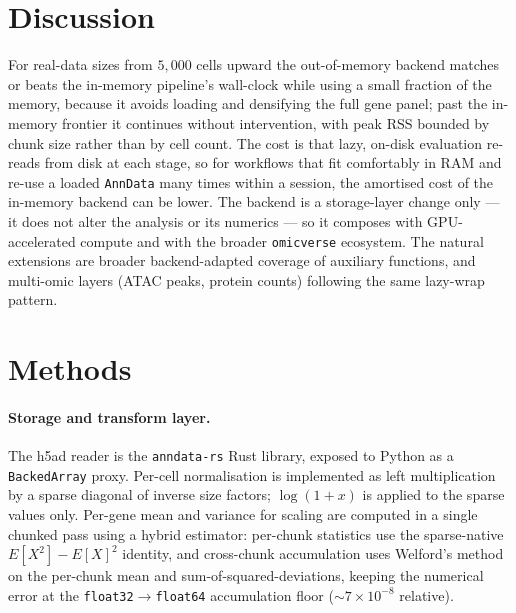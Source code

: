 \documentclass[11pt]{article}
\newcommand{\cmark}{\textcolor{green!55!black}{\checkmark}}
\newcommand{\xmark}{\textcolor{red!70!black}{\ensuremath{\times}}}
\begin{document}
\begin{table}[t]
  \centering\footnotesize
  \caption{\textbf{\texttt{omicverse.pp} compatibility} on the out-of-memory
    backend. \cmark\ = runs to completion; \xmark\ = raises (not yet
    backend-adapted); superscript \textsuperscript{G} marks a call that
    offloads to the GPU under \texttt{cpu-gpu-mixed}.}
  \label{tab:compat}
  
\end{table}

\section{Discussion}

For real-data sizes from $5{,}000$ cells upward the out-of-memory backend
matches or beats the in-memory pipeline's wall-clock while using a small
fraction of the memory, because it avoids loading and densifying the full
gene panel; past the in-memory frontier it continues without intervention,
with peak RSS bounded by chunk size rather than by cell count. The cost is
that lazy, on-disk evaluation re-reads from disk at each stage, so for
workflows that fit comfortably in RAM and re-use a loaded \texttt{AnnData}
many times within a session, the amortised cost of the in-memory backend can
be lower. The backend is a storage-layer change only --- it does not alter
the analysis or its numerics --- so it composes with GPU-accelerated compute
and with the broader \texttt{omicverse} ecosystem. The natural extensions are
broader backend-adapted coverage of auxiliary functions, and multi-omic
layers (ATAC peaks, protein counts) following the same lazy-wrap pattern.

\section{Methods}

\paragraph{Storage and transform layer.} The h5ad reader is the
\texttt{anndata-rs} Rust library, exposed to Python as a \texttt{BackedArray}
proxy. Per-cell normalisation is implemented as left multiplication by a
sparse diagonal of inverse size factors; $\log(1{+}x)$ is applied to the
sparse values only. Per-gene mean and variance for scaling are computed in a
single chunked pass using a hybrid estimator: per-chunk statistics use the
sparse-native $E[X^2]-E[X]^2$ identity, and cross-chunk accumulation uses
Welford's method\cite{welford1962numerically} on the per-chunk mean and
sum-of-squared-deviations, keeping the numerical error at the
\texttt{float32}$\to$\texttt{float64} accumulation floor
($\sim$$7\times10^{-8}$ relative).
\end{document}
